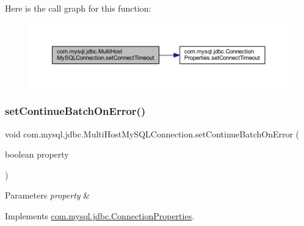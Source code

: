 Here is the call graph for this function\+:
\nopagebreak
\begin{figure}[H]
\begin{center}
\leavevmode
\includegraphics[width=350pt]{classcom_1_1mysql_1_1jdbc_1_1_multi_host_my_s_q_l_connection_ae1ddb08eaad091d37ab698280efcd668_cgraph}
\end{center}
\end{figure}
\mbox{\label{classcom_1_1mysql_1_1jdbc_1_1_multi_host_my_s_q_l_connection_a99f0b12351ec3cb5353af259a71bae1c}} 
\subsubsection{\texorpdfstring{set\+Continue\+Batch\+On\+Error()}{setContinueBatchOnError()}}
{\footnotesize\ttfamily void com.\+mysql.\+jdbc.\+Multi\+Host\+My\+S\+Q\+L\+Connection.\+set\+Continue\+Batch\+On\+Error (\begin{DoxyParamCaption}\item[{boolean}]{property }\end{DoxyParamCaption})}


\begin{DoxyParams}{Parameters}
{\em property} & \\
\hline
\end{DoxyParams}


Implements \mbox{\hyperlink{interfacecom_1_1mysql_1_1jdbc_1_1_connection_properties_a5f3f94fedf8c3162e2b825279a9d01ed}{com.\+mysql.\+jdbc.\+Connection\+Properties}}.

